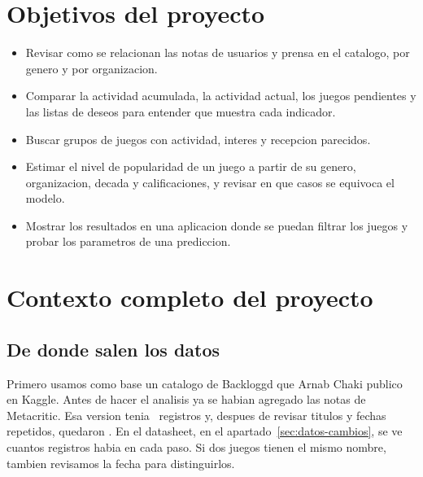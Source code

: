 \documentclass[letterpaper,11pt]{article}
\begin{document}
\hypersetup{pageanchor=false}
\begin{titlepage}\end{titlepage}
\newpage
{\makeatletter\let\ps@plain\ps@indice\makeatother
\pagestyle{indice}\thispagestyle{indice}\hypersetup{linkcolor=black}\tableofcontents\thispagestyle{indice}}
\newpage\setcounter{page}{1}\hypersetup{pageanchor=true}\singlespacing

\newcommand{\ReferenciaFigura}[1]{\begingroup\hypersetup{linkcolor=black}\hyperref[#1]{\underline{\ref*{#1}}}\endgroup}

\section{Objetivos del proyecto}
\begin{itemize}
\item Revisar como se relacionan las notas de usuarios y prensa en el catalogo, por genero y por organizacion.
\item Comparar la actividad acumulada, la actividad actual, los juegos pendientes y las listas de deseos para entender que muestra cada indicador.
\item Buscar grupos de juegos con actividad, interes y recepcion parecidos.
\item Estimar el nivel de popularidad de un juego a partir de su genero, organizacion, decada y calificaciones, y revisar en que casos se equivoca el modelo.
\item Mostrar los resultados en una aplicacion donde se puedan filtrar los juegos y probar los parametros de una prediccion.
\end{itemize}

\section{Contexto completo del proyecto}
\subsection{De donde salen los datos}
Primero usamos como base un catalogo de Backloggd que Arnab Chaki publico en Kaggle. Antes de hacer el analisis ya se habian agregado las notas de Metacritic. Esa version tenia \Historico\ registros y, despues de revisar titulos y fechas repetidos, quedaron \Catalogo. En el datasheet, en el apartado~\ref{sec:datos-cambios}, se ve cuantos registros habia en cada paso. Si dos juegos tienen el mismo nombre, tambien revisamos la fecha para distinguirlos.
\end{document}
